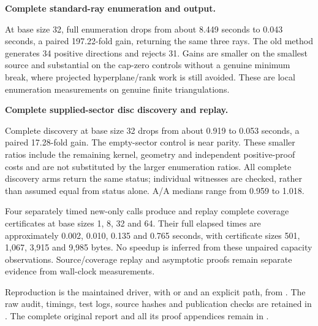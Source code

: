 \begin{samepage}
\noindent\textbf{Complete standard-ray enumeration and output.}

\end{samepage}

At base size 32, full enumeration drops from about 8.449 seconds to 0.043
seconds, a paired 197.22-fold gain, returning the same three rays. The old
method generates 34 positive directions and rejects 31. Gains are smaller
on the smallest source and substantial on the cap-zero controls without a
genuine minimum break, where projected hyperplane/rank work is still avoided.
These are local enumeration measurements on genuine finite triangulations.

\begin{samepage}
\noindent\textbf{Complete supplied-sector disc discovery and replay.}

\end{samepage}

Complete discovery at base size 32 drops from about 0.919 to 0.053 seconds,
a paired 17.28-fold gain. The empty-sector control is near parity. These
smaller ratios include the remaining kernel, geometry and independent
positive-proof costs and are not substituted by the larger enumeration
ratios. All complete discovery arms return the same status; individual
witnesses are checked, rather than assumed equal from status alone.
A/A medians range from 0.959 to 1.018.

Four separately timed new-only calls produce and replay complete coverage
certificates at base sizes 1, 8, 32 and 64. Their full elapsed times are
approximately 0.002, 0.010, 0.135 and 0.765 seconds, with certificate sizes
501, 1,067, 3,915 and 9,985 bytes. No speedup is inferred from these
unpaired capacity observations. Source/coverage replay and asymptotic
proofs remain separate evidence from wall-clock measurements.

\begin{sloppypar}
Reproduction is the maintained 
driver, with  or 
and an explicit  path, from . The raw audit,
timings, test logs, source hashes and publication checks are retained in
. The complete original report and all its proof
appendices remain in .
\end{sloppypar}
